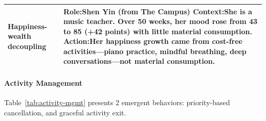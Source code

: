\begin{table}[t]
\begin{tabular}{p{0.8in}p{4.3in}}
Happiness-\newline wealth \newline decoupling
&
\textbf{Role:}\quad Shen Yin \hfill (from The Campus) \newline
\textbf{Context:}\quad She is a music teacher. Over 50 weeks, her  \textbf{mood rose from 43 to 85} (+42 points) \textbf{with little material consumption}. \newline
\textbf{Action:}\quad Her happiness growth came from \textbf{cost-free activities}---piano practice, mindful breathing, deep conversations---not material consumption. 
\\
\bottomrule
\end{tabular}
\end{table}

\paragraph{Activity Management}
Table~\ref{tab:activity-mgmt} presents 2 emergent behaviors:
priority-based cancellation, and graceful activity exit.

